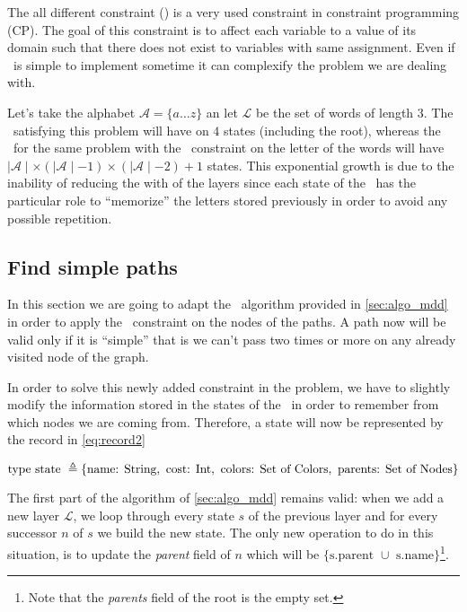 
The all different constraint (\alldiff) is a very used constraint in constraint programming (CP). The goal of this constraint is to affect each variable to a value of its domain such that there does not exist to variables with same assignment. Even if \alldiff\ is simple to implement sometime it can complexify the problem we are dealing with.

Let's take the alphabet $\mathcal{A} = \{a \dots z\}$ an let $\mathcal{L}$ be the set of words of length $3$. The \mdd\ satisfying this problem will have on $4$ states (including the root), whereas the \mdd\ for the same problem with the \alldiff\ constraint on the letter of the words will have $\mid \mathcal{A} \mid \times (\mid \mathcal{A} \mid - 1) \times (\mid \mathcal{A} \mid - 2) + 1$ states. This exponential growth is due to the inability of reducing the with of the layers since each state of the \mdd\ has the particular role to ``memorize'' the letters stored previously in order to avoid any possible repetition.

\subsection{Find simple paths}

In this section we are going to adapt the \mdd\ algorithm provided in \cref{sec:algo_mdd} in order to apply the \alldiff\ constraint on the nodes of the paths. A path now will be valid only if it is ``simple'' that is we can't pass two times or more on any already visited node of the graph.

In order to solve this newly added constraint in the problem, we have to slightly modify the information stored in the states of the \mdd\ in order to remember from which nodes we are coming from. Therefore, a state will now be represented by the record in \cref{eq:record2}

\begin{equation}
  \label{eq:record2}
  \text{type state } \triangleq \{\text{name: } \text{String}, \text{ cost: } \text{Int}, \text{ colors: } \text{Set of Colors}, \text{ parents: } \text{Set of Nodes} \}
\end{equation}

The first part of the algorithm of \cref{sec:algo_mdd} remains valid: when we add a new layer $\mathcal{L}$, we loop through every state $s$ of the previous layer and for every successor $n$ of $s$ we build the new state. The only new operation to do in this situation, is to update the \textit{parent} field of $n$ which will be $\{\text{s.parent } \cup \text{ s.name}\}$\footnote{Note that the \textit{parents} field of the root is the empty set.}.

